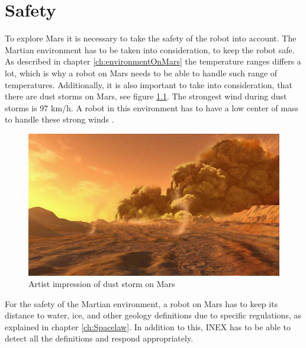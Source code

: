 \chapter{Safety}

To explore Mars it is necessary to take the safety of the robot into account. The Martian environment has to be taken into consideration, to keep the robot safe.
As described in chapter \ref{ch:environmentOnMars} the temperature ranges differs a lot, which is why a robot on Mars needs to be able to handle such range of temperatures. Additionally, it is also important to take into consideration, that there are dust storms on Mars, see figure \ref{fig:Duststorm }. The strongest wind during dust storms is 97 km/h. A robot in this environment has to have a low center of mass to handle these strong winds\cite{AspectsWeather} \cite{AspectsTemperature}.

\begin{figure}[h]
    \centering
    \includegraphics[width=.7\textwidth]{figures/dust-storm-on-mars2.jpg}
    \caption{Artist impression of dust storm on Mars \cite{Duststorm}} 
    \label{fig:Duststorm } 
\end{figure}

For the safety of the Martian environment, a robot on Mars has to keep its distance to water, ice, and other geology definitions due to specific regulations, as explained in chapter \ref{ch:Spacelaw}. In addition to this, INEX has to be able to detect all the definitions and respond appropriately\cite{AspectsWeather}.






